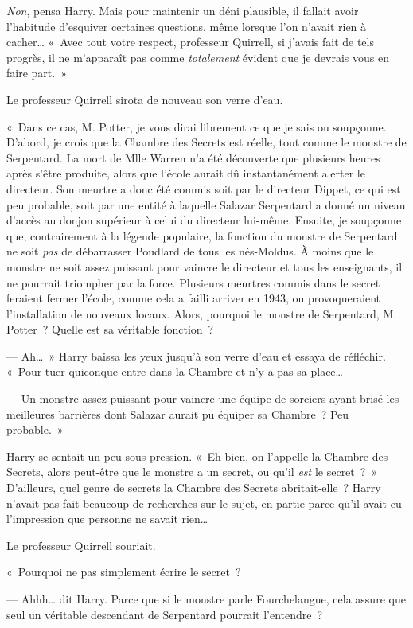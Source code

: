 \emph{Non}, pensa Harry. Mais pour maintenir un déni plausible, il fallait avoir l'habitude d'esquiver certaines questions, même lorsque l'on n'avait rien à cacher… «~Avec tout votre respect, professeur Quirrell, si j'avais fait de tels progrès, il ne m'apparaît pas comme \emph{totalement} évident que je devrais vous en faire part.~»

Le professeur Quirrell sirota de nouveau son verre d'eau.

«~Dans ce cas, M. Potter, je vous dirai librement ce que je sais ou soupçonne. D'abord, je crois que la Chambre des Secrets est réelle, tout comme le monstre de Serpentard. La mort de Mlle Warren n'a été découverte que plusieurs heures après s'être produite, alors que l'école aurait dû instantanément alerter le directeur. Son meurtre a donc été commis soit par le directeur Dippet, ce qui est peu probable, soit par une entité à laquelle Salazar Serpentard a donné un niveau d'accès au donjon supérieur à celui du directeur lui-même. Ensuite, je soupçonne que, contrairement à la légende populaire, la fonction du monstre de Serpentard ne soit \emph{pas} de débarrasser Poudlard de tous les nés-Moldus. À moins que le monstre ne soit assez puissant pour vaincre le directeur et tous les enseignants, il ne pourrait triompher par la force. Plusieurs meurtres commis dans le secret feraient fermer l'école, comme cela a failli arriver en 1943, ou provoqueraient l'installation de nouveaux locaux. Alors, pourquoi le monstre de Serpentard, M. Potter~? Quelle est sa véritable fonction~?

--- Ah…~» Harry baissa les yeux jusqu'à son verre d'eau et essaya de réfléchir. «~Pour tuer quiconque entre dans la Chambre et n'y a pas sa place…

--- Un monstre assez puissant pour vaincre une équipe de sorciers ayant brisé les meilleures barrières dont Salazar aurait pu équiper sa Chambre~? Peu probable.~»

Harry se sentait un peu sous pression. «~Eh bien, on l'appelle la Chambre des Secrets, alors peut-être que le monstre a un secret, ou qu'il \emph{est} le secret~?~» D'ailleurs, quel genre de secrets la Chambre des Secrets abritait-elle~? Harry n'avait pas fait beaucoup de recherches sur le sujet, en partie parce qu'il avait eu l'impression que personne ne savait rien…

Le professeur Quirrell souriait.

«~Pourquoi ne pas simplement écrire le secret~?

--- Ahhh… dit Harry. Parce que si le monstre parle Fourchelangue, cela assure que seul un véritable descendant de Serpentard pourrait l'entendre~?

